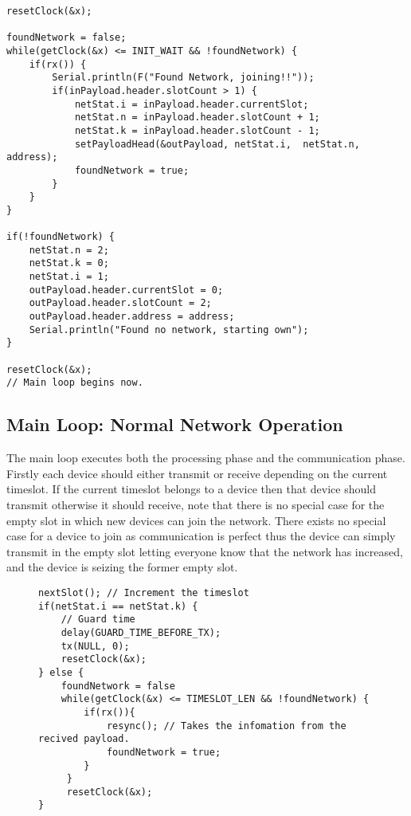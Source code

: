 \begin{lstlisting}[style=customc,caption={Startup, if a network is found join it, if not create one.},label={lst:ccrc:startup}]
resetClock(&x);

foundNetwork = false;
while(getClock(&x) <= INIT_WAIT && !foundNetwork) {
    if(rx()) {
        Serial.println(F("Found Network, joining!!"));
        if(inPayload.header.slotCount > 1) {
            netStat.i = inPayload.header.currentSlot;
            netStat.n = inPayload.header.slotCount + 1;
            netStat.k = inPayload.header.slotCount - 1;
            setPayloadHead(&outPayload, netStat.i,  netStat.n, address);
            foundNetwork = true;
        }
    }
}

if(!foundNetwork) {
    netStat.n = 2;
    netStat.k = 0;
    netStat.i = 1; 
    outPayload.header.currentSlot = 0;
    outPayload.header.slotCount = 2;
    outPayload.header.address = address;
    Serial.println("Found no network, starting own");
}

resetClock(&x);
// Main loop begins now.
\end{lstlisting}

\subsection{Main Loop: Normal Network Operation}
The main loop executes both the processing phase and the communication phase.
Firstly each device should either transmit or receive depending on the current timeslot. 
If the current timeslot belongs to a device then that device should transmit otherwise it should receive, note that there is no special case for the empty slot in which new devices can join the network.
There exists no special case for a device to join as communication is perfect thus the device can simply transmit in the empty slot letting everyone know that the network has increased, and the device is seizing the former empty slot.
\begin{figure}
\begin{lstlisting}[style=customc,caption={Main loop deciding whether to transmit or receive.},label={lst:ccrc:rxortx}]
nextSlot(); // Increment the timeslot
if(netStat.i == netStat.k) {
    // Guard time
    delay(GUARD_TIME_BEFORE_TX);
    tx(NULL, 0);
    resetClock(&x);
} else {
    foundNetwork = false
    while(getClock(&x) <= TIMESLOT_LEN && !foundNetwork) {
        if(rx()){
            resync(); // Takes the infomation from the recived payload.
            foundNetwork = true;
        }
     }
     resetClock(&x);
}
\end{lstlisting}
\end{figure}


